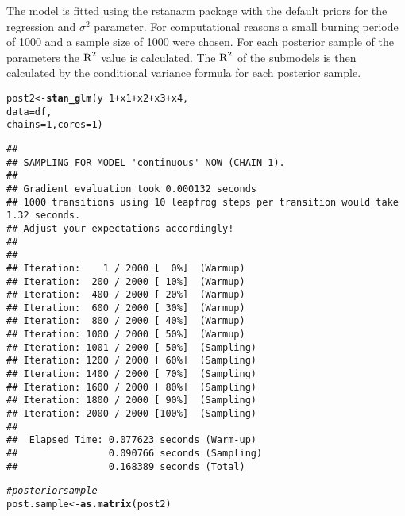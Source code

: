\documentclass[11pt,a4paper,twoside]{book}
\makeatletter
\newcommand{\hlnum}[1]{\textcolor[rgb]{0.686,0.059,0.569}{#1}}%
\newcommand{\hlcom}[1]{\textcolor[rgb]{0.678,0.584,0.686}{\textit{#1}}}%
\newcommand{\hlopt}[1]{\textcolor[rgb]{0,0,0}{#1}}%
\newcommand{\hlstd}[1]{\textcolor[rgb]{0.345,0.345,0.345}{#1}}%
\newcommand{\hlkwb}[1]{\textcolor[rgb]{0.69,0.353,0.396}{#1}}%
\newcommand{\hlkwc}[1]{\textcolor[rgb]{0.333,0.667,0.333}{#1}}%
\newcommand{\hlkwd}[1]{\textcolor[rgb]{0.737,0.353,0.396}{\textbf{#1}}}%
\newenvironment{kframe}{%
 \def\at@end@of@kframe{}%
 \ifinner\ifhmode%
  \def\at@end@of@kframe{\end{minipage}}%
  \begin{minipage}{\columnwidth}%
 \fi\fi%
 \def\FrameCommand##1{\hskip\@totalleftmargin \hskip-\fboxsep
 \colorbox{shadecolor}{##1}\hskip-\fboxsep
     \hskip-\linewidth \hskip-\@totalleftmargin \hskip\columnwidth}%
 \MakeFramed {\advance\hsize-\width
   \@totalleftmargin\z@ \linewidth\hsize
   \@setminipage}}%
 {\par\unskip\endMakeFramed%
 \at@end@of@kframe}
\newenvironment{knitrout}{}{} %
\makeatother
\begin{document}
The model is fitted using the rstanarm package with the default priors for the regression and $\sigma^2$ parameter. For computational reasons a small burning periode of 1000 and a sample size of 1000 were chosen. For each posterior sample of the parameters the $\text{R}^2$ value is calculated. The $\text{R}^2$ of the submodels is then calculated by the conditional variance formula for each posterior sample.


\begin{knitrout}
\color{fgcolor}\begin{kframe}
\begin{alltt}
\hlstd{post2} \hlkwb{<-} \hlkwd{stan_glm}\hlstd{(y} \hlopt{~} \hlnum{1} \hlopt{+} \hlstd{x1} \hlopt{+} \hlstd{x2} \hlopt{+} \hlstd{x3} \hlopt{+} \hlstd{x4,}
                  \hlkwc{data} \hlstd{= df,}
                  \hlkwc{chains} \hlstd{=} \hlnum{1}\hlstd{,} \hlkwc{cores} \hlstd{=} \hlnum{1}\hlstd{)}
\end{alltt}
\begin{verbatim}
## 
## SAMPLING FOR MODEL 'continuous' NOW (CHAIN 1).
## 
## Gradient evaluation took 0.000132 seconds
## 1000 transitions using 10 leapfrog steps per transition would take 1.32 seconds.
## Adjust your expectations accordingly!
## 
## 
## Iteration:    1 / 2000 [  0%]  (Warmup)
## Iteration:  200 / 2000 [ 10%]  (Warmup)
## Iteration:  400 / 2000 [ 20%]  (Warmup)
## Iteration:  600 / 2000 [ 30%]  (Warmup)
## Iteration:  800 / 2000 [ 40%]  (Warmup)
## Iteration: 1000 / 2000 [ 50%]  (Warmup)
## Iteration: 1001 / 2000 [ 50%]  (Sampling)
## Iteration: 1200 / 2000 [ 60%]  (Sampling)
## Iteration: 1400 / 2000 [ 70%]  (Sampling)
## Iteration: 1600 / 2000 [ 80%]  (Sampling)
## Iteration: 1800 / 2000 [ 90%]  (Sampling)
## Iteration: 2000 / 2000 [100%]  (Sampling)
## 
##  Elapsed Time: 0.077623 seconds (Warm-up)
##                0.090766 seconds (Sampling)
##                0.168389 seconds (Total)
\end{verbatim}
\begin{alltt}
\hlcom{#posterior sample}
\hlstd{post.sample} \hlkwb{<-} \hlkwd{as.matrix}\hlstd{(post2)}


\end{alltt}
\end{kframe}
\end{knitrout}
\end{document}
